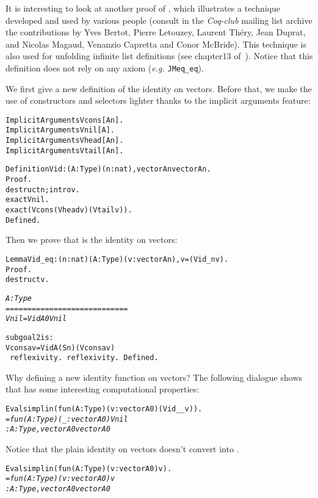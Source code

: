\documentclass[11pt]{article}
\begin{document}
It is interesting to look at another proof of 
, which illustrates a technique developed
and used by various people (consult in the \emph{Coq-club} mailing
list archive the contributions by Yves Bertot, Pierre Letouzey, Laurent Théry,
Jean Duprat, and Nicolas Magaud, Venanzio Capretta and Conor McBride).
This technique is also used for unfolding  infinite list definitions
(see chapter13 of~\cite{coqart}).
Notice that this definition does not rely on any axiom (\emph{e.g.} \texttt{JMeq\_eq}).

We first give a new definition of the identity on vectors. Before that,
we make  the use of constructors and selectors lighter thanks to
the implicit arguments feature:

\begin{alltt}
Implicit Arguments Vcons [A n].
Implicit Arguments Vnil [A].
Implicit Arguments Vhead [A n].
Implicit Arguments Vtail [A n].

Definition Vid : {\prodsym} (A : Type)(n:nat), vector A n {\arrow} vector A n.
Proof.
 destruct n; intro v.
 exact Vnil.
 exact (Vcons (Vhead v) (Vtail v)).
Defined.
\end{alltt}


Then we prove that  is the identity on vectors:

\begin{alltt}
Lemma Vid_eq : {\prodsym} (n:nat) (A:Type)(v:vector A n), v=(Vid _ n v).
Proof.
 destruct v.

\it
   A : Type
  ============================
   Vnil = Vid A 0 Vnil

subgoal 2 is:
  Vcons a v = Vid A (S n) (Vcons a v)
\tt
 reflexivity.
 reflexivity.
Defined.
\end{alltt}

Why defining a new identity function on vectors? The following
dialogue shows that  has some interesting computational
properties:

\begin{alltt}
Eval simpl in (fun (A:Type)(v:vector A 0) {\funarrow} (Vid _ _ v)).
\it = fun (A : Type) (_ : vector A 0) {\funarrow} Vnil
     : {\prodsym} A : Type, vector A 0 {\arrow} vector A 0

\end{alltt}

Notice that the plain identity on vectors doesn't convert 
into .
\begin{alltt}
Eval simpl in (fun (A:Type)(v:vector A 0) {\funarrow} v).
\it = fun (A : Type) (v : vector A 0) {\funarrow} v
     : {\prodsym} A : Type, vector A 0 {\arrow} vector A 0
\end{alltt}
\end{document}
